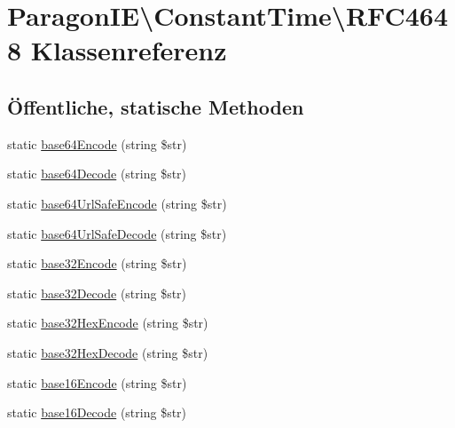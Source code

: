 \hypertarget{class_paragon_i_e_1_1_constant_time_1_1_r_f_c4648}{}\section{Paragon\+IE\textbackslash{}Constant\+Time\textbackslash{}R\+F\+C4648 Klassenreferenz}
\label{class_paragon_i_e_1_1_constant_time_1_1_r_f_c4648}
\subsection*{Öffentliche, statische Methoden}
\begin{DoxyCompactItemize}
\item 
static \mbox{\hyperlink{class_paragon_i_e_1_1_constant_time_1_1_r_f_c4648_ae16d6fbcc4ec228b3661bda9fec24c26}{base64\+Encode}} (string \$str)
\item 
static \mbox{\hyperlink{class_paragon_i_e_1_1_constant_time_1_1_r_f_c4648_a9805353dd583a6ff4780ea900a0e073e}{base64\+Decode}} (string \$str)
\item 
static \mbox{\hyperlink{class_paragon_i_e_1_1_constant_time_1_1_r_f_c4648_a4a4c9025f2741e223d5410c69e4c173b}{base64\+Url\+Safe\+Encode}} (string \$str)
\item 
static \mbox{\hyperlink{class_paragon_i_e_1_1_constant_time_1_1_r_f_c4648_ae5c8e208c1ac39cc1e8b7cf3458e8284}{base64\+Url\+Safe\+Decode}} (string \$str)
\item 
static \mbox{\hyperlink{class_paragon_i_e_1_1_constant_time_1_1_r_f_c4648_a420ef0ca100ded58695f088a1f28a6f0}{base32\+Encode}} (string \$str)
\item 
static \mbox{\hyperlink{class_paragon_i_e_1_1_constant_time_1_1_r_f_c4648_a23c50e86d64a756e67b23769ec0ab93e}{base32\+Decode}} (string \$str)
\item 
static \mbox{\hyperlink{class_paragon_i_e_1_1_constant_time_1_1_r_f_c4648_aef46f4c5ab0c0751bc7abaa922cc4c58}{base32\+Hex\+Encode}} (string \$str)
\item 
static \mbox{\hyperlink{class_paragon_i_e_1_1_constant_time_1_1_r_f_c4648_ada94aad563f01529bbd337ad039a6c2c}{base32\+Hex\+Decode}} (string \$str)
\item 
static \mbox{\hyperlink{class_paragon_i_e_1_1_constant_time_1_1_r_f_c4648_ac2879c3f34814bf343c10930676cd795}{base16\+Encode}} (string \$str)
\item 
static \mbox{\hyperlink{class_paragon_i_e_1_1_constant_time_1_1_r_f_c4648_a115b818039a13f23e85cde4b1ddd1b00}{base16\+Decode}} (string \$str)
\end{DoxyCompactItemize}


